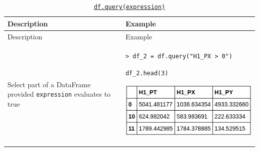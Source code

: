 \documentclass[10pt,a4paperpaper,]{article}
\begin{document}
\begin{longtable}[]{@{}ll@{}}
\caption{\href{http://pandas.pydata.org/pandas-docs/stable/generated/pandas.DataFrame.query.html}{\texttt{df.query(expression)}}}\tabularnewline
\toprule
\begin{minipage}[b]{0.47\columnwidth}\raggedright\strut
Description\strut
\end{minipage} & \begin{minipage}[b]{0.47\columnwidth}\raggedright\strut
Example\strut
\end{minipage}\tabularnewline
\midrule
\endfirsthead
\toprule
\begin{minipage}[b]{0.47\columnwidth}\raggedright\strut
Description\strut
\end{minipage} & \begin{minipage}[b]{0.47\columnwidth}\raggedright\strut
Example\strut
\end{minipage}\tabularnewline
\midrule
\endhead
\begin{minipage}[t]{0.47\columnwidth}\raggedright\strut
Select part of a DataFrame provided \texttt{expression} evaluates to
true\strut
\end{minipage} & \begin{minipage}[t]{0.47\columnwidth}\raggedright\strut
\texttt{\textgreater{}\ df\_2\ =\ df.query("H1\_PX\ \textgreater{}\ 0")}

\texttt{df\_2.head(3)}

\includegraphics[width=\textwidth]{assets/06-query.png}\strut
\end{minipage}\tabularnewline
\bottomrule
\end{longtable}
\end{document}
